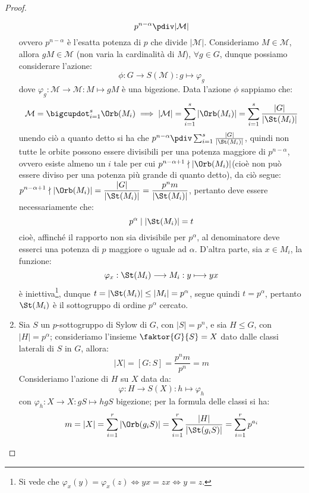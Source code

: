 \documentclass[11pt]{scrartcl}
\begin{document}
\begin{proof}
\begin{enumerate}[(1)]
                \[ p^{n - \alpha} \pdiv |\mathcal{M}|
                    \] 
                ovvero $p^{n - \alpha}$ è l'esatta potenza di $p$ che divide $|\mathcal{M}|$.
                Consideriamo $M \in \mathcal{M}$, allora $gM \in \mathcal{M}$ (non varia la cardinalità di $M$), $\forall g \in G$, dunque possiamo considerare l'azione:
                \[ \phi : G \longrightarrow S(\mathcal{M}) : g \longmapsto \varphi_g
                    \]
                dove $\varphi_g : \mathcal{M} \longrightarrow \mathcal{M} : M \longmapsto gM$ è una bigezione. Data l'azione $\phi$ sappiamo che:
                \[ \mathcal{M} = \bigcupdot_{i = 1}^{s}\Orb(M_i) \implies |\mathcal{M}| = \sum_{i = 1}^{s} |\Orb(M_i)| = \sum_{i = 1}^s \frac{|G|}{|\St(M_i)|}
                    \]
                unendo ciò a quanto detto si ha che $p^{n - \alpha} \pdiv \sum_{i = 1}^s \frac{|G|}{|\St(M_i)|}$, quindi non tutte le orbite possono essere divisibili per una potenza maggiore di $p^{n - \alpha}$, ovvero esiste almeno un $i$
                tale per cui $p^{n - \alpha + 1} \nmid |\Orb(M_i)|$(cioè non può essere diviso per una potenza più grande di quanto detto), da ciò segue: $\displaystyle p^{n - \alpha + 1} \nmid |\Orb(M_i)| = \frac{|G|}{|\St(M_i)|} = \frac{p^nm}{|\St(M_i)|}$,
                pertanto deve essere necessariamente che:
                \[ p^{\alpha} \mid |\St(M_i)| = t
                    \]
                cioè, affinché il rapporto non sia divisibile per $p^{\alpha}$, al denominatore deve esserci una potenza di $p$ maggiore o uguale ad $\alpha$. D'altra parte, sia $x \in M_i$, la funzione:
                \[ \varphi_x : \St(M_i) \longrightarrow M_i : y \longmapsto yx 
                    \]
                è iniettiva\footnote{Si vede che $\varphi_x(y) = \varphi_x(z) \iff yx = zx \iff y = z$.}, dunque $t = |\St(M_i)| \leq |M_i| = p^{\alpha}$, segue quindi $t = p^{\alpha}$, pertanto $\St(M_i)$ è il sottogruppo di ordine $p^{\alpha}$ cercato.
            \item Sia $S$ un $p$-sottogruppo di Sylow di $G$, con $|S| = p^n$, e sia $H \leqslant G$, con $|H| = p^{\alpha}$; consideriamo l'insieme $\faktor{G}{S} = X$ dato dalle classi laterali di $S$ in $G$, allora:
                \[ |X| = [G : S] = \frac{p^nm}{p^n} = m
                    \]
                Consideriamo l'azione di $H$ su $X$ data da:
                \[ \varphi: H \longrightarrow S(X) : h \longmapsto \varphi_h
                    \]
                con $\varphi_h : X \longrightarrow X : gS \longmapsto hgS$ bigezione; per la formula delle classi si ha:
                \[ m = |X| = \sum_{i = 1}^{r}|\Orb(g_iS)| = \sum_{i = 1}^{r} \frac{|H|}{|\St(g_iS)|} = \sum_{i = 1}^{r} p^{a_i}
\]
\end{enumerate}
\end{proof}
\end{document}
